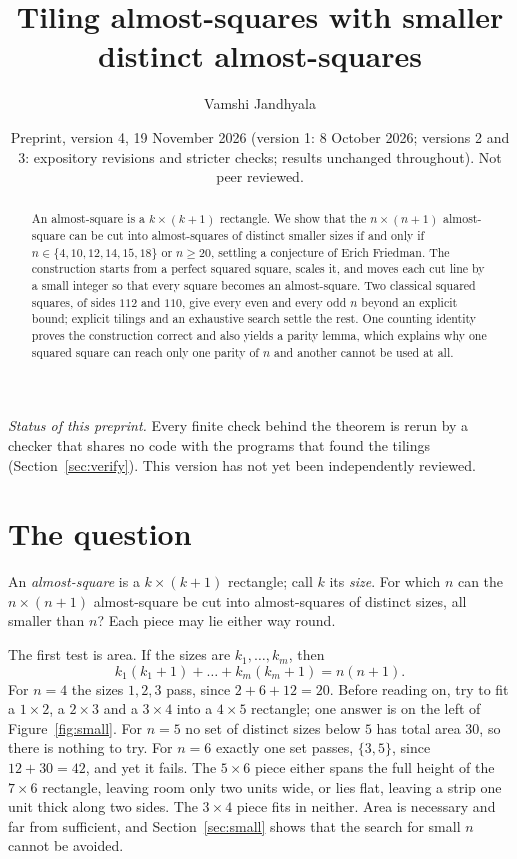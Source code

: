 \documentclass[11pt]{amsart}
\title[Tiling almost-squares]{Tiling almost-squares with smaller distinct almost-squares}
\author{Vamshi Jandhyala}
\date{Preprint, version 4, 19 November 2026 (version 1: 8 October 2026; versions 2 and 3: expository revisions and stricter checks; results unchanged throughout). Not peer reviewed.}
\theoremstyle{definition}
\begin{document}
\raggedbottom

\begin{abstract}
An almost-square is a $k\times(k+1)$ rectangle. We show that the $n\times(n+1)$ almost-square can be
cut into almost-squares of distinct smaller sizes if and only if $n\in\{4,10,12,14,15,18\}$ or
$n\ge20$, settling a conjecture of Erich Friedman. The construction starts from a perfect squared
square, scales it, and moves each cut line by a small integer so that every square becomes an
almost-square. Two classical squared squares, of sides $112$ and $110$, give every even and every
odd $n$ beyond an explicit bound; explicit tilings and an exhaustive search settle the rest. One
counting identity proves the construction correct and also yields a parity lemma, which explains
why one squared square can reach only one parity of $n$ and another cannot be used at all.
\end{abstract}
\maketitle

\noindent\emph{Status of this preprint.} Every finite check behind the theorem is rerun by a checker
that shares no code with the programs that found the tilings (Section~\ref{sec:verify}). This version
has not yet been independently reviewed.

\section{The question}

An \emph{almost-square} is a $k\times(k+1)$ rectangle; call $k$ its \emph{size}. For which $n$ can
the $n\times(n+1)$ almost-square be cut into almost-squares of distinct sizes, all smaller than $n$?
Each piece may lie either way round.

The first test is area. If the sizes are $k_1,\dots,k_m$, then
\begin{equation}\label{eq:area}
k_1(k_1+1)+\dots+k_m(k_m+1)=n(n+1).
\end{equation}
For $n=4$ the sizes $1,2,3$ pass, since $2+6+12=20$. Before reading on, try to fit a $1\times2$, a
$2\times3$ and a $3\times4$ into a $4\times5$ rectangle; one answer is on the left of
Figure~\ref{fig:small}. For $n=5$ no set of distinct sizes below $5$ has total area $30$, so there is
nothing to try. For $n=6$ exactly one set passes, $\{3,5\}$, since $12+30=42$, and yet it fails. The
$5\times6$ piece either spans the full height of the $7\times6$ rectangle, leaving room only two units
wide, or lies flat, leaving a strip one unit thick along two sides. The $3\times4$ piece fits in
neither. Area is necessary and far from sufficient, and Section~\ref{sec:small} shows that the
search for small $n$ cannot be avoided.
\end{document}
